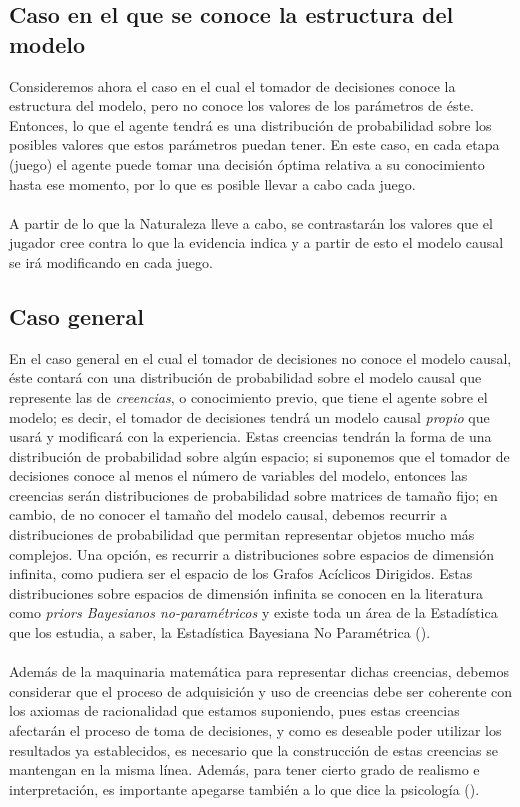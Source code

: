 \documentclass[11pt]{article}
\theoremstyle{plain}
\begin{document}
\subsection{Caso en el que se conoce la estructura del modelo}
Consideremos ahora el caso en el cual el tomador de decisiones conoce la estructura del modelo, pero no conoce los valores de los parámetros de éste. Entonces, lo que el agente tendrá es una distribución de probabilidad sobre los posibles valores que estos parámetros puedan tener. En este caso, en cada etapa (juego) el agente puede tomar una decisión óptima relativa a su conocimiento hasta ese momento, por lo que es posible llevar a cabo cada juego.\\
\\
A partir de lo que la Naturaleza lleve a cabo, se contrastarán los valores que el jugador cree contra lo que la evidencia indica y a partir de esto el modelo causal se irá modificando en cada juego.
\subsection{Caso general}
En el caso general en el cual el tomador de decisiones no conoce el modelo causal, éste contará con una distribución de probabilidad sobre el modelo causal que represente las de \textit{creencias}, o conocimiento previo, que tiene el agente sobre el modelo; es decir, el tomador de decisiones tendrá un modelo causal \textit{propio} que usará y modificará con la experiencia. Estas creencias tendrán la forma de una distribución de probabilidad sobre algún espacio; si suponemos que el tomador de decisiones conoce al menos el número de variables del modelo, entonces las creencias serán distribuciones de probabilidad sobre matrices de tamaño fijo; en cambio, de no conocer el tamaño del modelo causal, debemos recurrir a distribuciones de probabilidad que permitan representar objetos mucho más complejos. Una opción, es recurrir a distribuciones sobre espacios de dimensión infinita, como pudiera ser el espacio de los Grafos Acíclicos Dirigidos. Estas distribuciones sobre espacios de dimensión infinita se conocen en la literatura como \textit{priors Bayesianos no-paramétricos} y existe toda un área de la Estadística que los estudia, a saber, la Estadística Bayesiana No Paramétrica (\cite{ghosal2017fundamentals}).\\
\\
\indent Además de la maquinaria matemática para representar dichas creencias, debemos considerar que el proceso de adquisición y uso de creencias debe ser coherente con los axiomas de racionalidad que estamos suponiendo, pues estas creencias afectarán el proceso de toma de decisiones, y como es deseable poder utilizar los resultados ya establecidos, es necesario que la construcción de estas creencias se mantengan en la misma línea. Además, para tener cierto grado de realismo e interpretación, es importante apegarse también a lo que dice la psicología (\cite{larrouy2017mindreading}).
\end{document}
